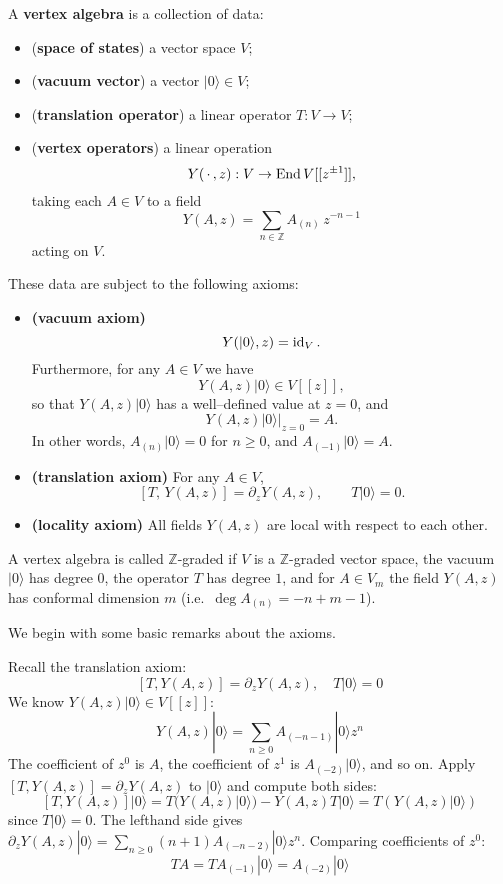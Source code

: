 \documentclass[12pt]{article}
\begin{document}
\begin{definition}
A \textbf{vertex algebra} is a collection of data:
\begin{itemize}
    \item (\textbf{space of states}) a vector space $V$;
    \item (\textbf{vacuum vector}) a vector $\lvert 0 \rangle \in V$;
    \item (\textbf{translation operator}) a linear operator $T : V \to V$;
    \item (\textbf{vertex operators}) a linear operation
    \[
        Y(\,\cdot\,,z) : V \to \operatorname{End} V[[z^{\pm1}]],
    \]
    taking each $A \in V$ to a field
    \[
        Y(A,z) = \sum_{n \in \mathbb{Z}} A_{(n)}\,z^{-n-1}
    \]
    acting on $V$.
\end{itemize}

These data are subject to the following axioms:
\begin{itemize}
    \item \textbf{(vacuum axiom)} 
    \[
        Y(\lvert 0 \rangle, z) = \operatorname{id}_V.
    \]
    Furthermore, for any $A \in V$ we have
    \[
        Y(A,z)\lvert 0 \rangle \in V[[z]],
    \]
    so that $Y(A,z)\lvert 0 \rangle$ has a well–defined value at $z=0$, and
    \[
        Y(A,z)\lvert 0 \rangle\big|_{z=0} = A.
    \]
    In other words, $A_{(n)}\lvert 0 \rangle = 0$ for $n \ge 0$, and 
    $A_{(-1)}\lvert 0 \rangle = A$.
    
    \item \textbf{(translation axiom)}
    For any $A \in V$,
    \[
        [T,\,Y(A,z)] = \partial_z Y(A,z),
    \qquad
    T\lvert 0 \rangle = 0.
    \]

    \item \textbf{(locality axiom)}
    All fields $Y(A,z)$ are local with respect to each other.
\end{itemize}

A vertex algebra is called \(\mathbb{Z}\)-graded if \(V\) is a 
\(\mathbb{Z}\)-graded vector space, 
the vacuum \(\lvert 0 \rangle\) has degree \(0\),
the operator \(T\) has degree \(1\), and for \(A \in V_m\) the field \(Y(A,z)\) 
has conformal dimension \(m\) (i.e.\ $\deg A_{(n)} = -n + m - 1$).
\end{definition}

We begin with some basic remarks about the axioms.
\begin{remark}
    [$T$ is determined by $Y$] Recall the translation axiom:
    \[[T, Y(A,z)] = \partial_z Y(A,z), \quad T|0\rangle = 0\]
    We know $Y(A,z)|0\rangle \in V[[z]]$:
    \[Y(A,z)|0\rangle = \sum_{n\ge 0} A_{(-n-1)}|0\rangle z^n \]
    The coefficient of $z^0$ is $A$, the coefficient of $z^1$ is $A_{(-2)}|0\rangle$, and so on. Apply $[T,Y(A,z)] = \partial_z Y(A,z)$ to $|0\rangle$ and compute both sides:
    \[[T, Y(A,z)]|0\rangle = T(Y(A,z)|0\rangle) - Y(A,z)T|0\rangle = T(Y(A,z)|0\rangle)\]
    since $T|0\rangle=0$.
    The lefthand side gives
    $\partial_z Y(A,z)|0\rangle = \sum_{n\ge 0} (n+1)A_{(-n-2)}|0\rangle z^n$. Comparing coefficients of $z^0$:
    \[TA = T A_{(-1)}|0\rangle = A_{(-2)}|0\rangle\]
\end{remark}
\end{document}

